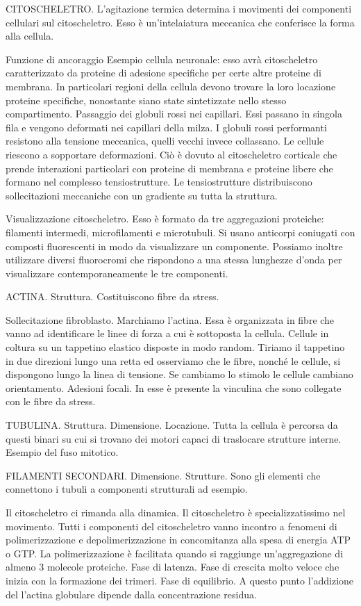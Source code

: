 \documentclass[a4paper,12pt]{article}
\begin{document}
CITOSCHELETRO.
L'agitazione termica determina i movimenti dei componenti cellulari sul citoscheletro.
Esso è un'intelaiatura meccanica che conferisce la forma alla cellula.

Funzione di ancoraggio
Esempio cellula neuronale: esso avrà citoscheletro caratterizzato da proteine di adesione specifiche per certe altre proteine di membrana. In particolari regioni della cellula devono trovare la loro locazione proteine specifiche, nonostante siano state sintetizzate nello stesso compartimento.
Passaggio dei globuli rossi nei capillari. Essi passano in singola fila e vengono deformati nei capillari della milza. I globuli rossi performanti resistono alla tensione meccanica, quelli vecchi invece collassano.
Le cellule riescono a sopportare deformazioni. Ciò è dovuto al citoscheletro corticale che prende interazioni particolari con proteine di membrana e proteine libere che formano nel complesso tensiostrutture.
Le tensiostrutture distribuiscono sollecitazioni meccaniche con un gradiente su tutta la struttura.

Visualizzazione citoscheletro. Esso è formato da tre aggregazioni proteiche: filamenti intermedi, microfilamenti e microtubuli.
Si usano anticorpi coniugati con composti fluorescenti in modo da visualizzare un componente. Possiamo inoltre utilizzare diversi fluorocromi che rispondono a una stessa lunghezze d'onda per visualizzare contemporaneamente le tre componenti.

ACTINA. Struttura. Costituiscono fibre da stress. 


Sollecitazione fibroblasto. Marchiamo l'actina. Essa è organizzata in fibre che vanno ad identificare le linee di forza a cui è sottoposta la cellula.
Cellule in coltura su un tappetino elastico disposte in modo random. Tiriamo il tappetino in due direzioni lungo una retta ed osserviamo che le fibre, nonché le cellule, si dispongono lungo la linea di tensione. Se cambiamo lo stimolo le cellule cambiano orientamento.
Adesioni focali. In esse è presente la vinculina che sono collegate con le fibre da stress.


TUBULINA. Struttura. Dimensione. Locazione.
Tutta la cellula è percorsa da questi binari su cui si trovano dei motori capaci di traslocare strutture interne. Esempio del fuso mitotico.

FILAMENTI SECONDARI. Dimensione. Strutture.
Sono gli elementi che connettono i tubuli a componenti strutturali ad esempio.

Il citoscheletro ci rimanda alla dinamica. Il citoscheletro è specializzatissimo nel movimento. Tutti i componenti del citoscheletro vanno incontro a fenomeni di polimerizzazione e depolimerizzazione in concomitanza alla spesa di energia ATP o GTP. La polimerizzazione è facilitata quando si raggiunge un'aggregazione di almeno 3 molecole proteiche. 
Fase di latenza. Fase di crescita molto veloce che inizia con la formazione dei trimeri. Fase di equilibrio. A questo punto l'addizione del l'actina globulare dipende dalla concentrazione residua.
\end{document}
